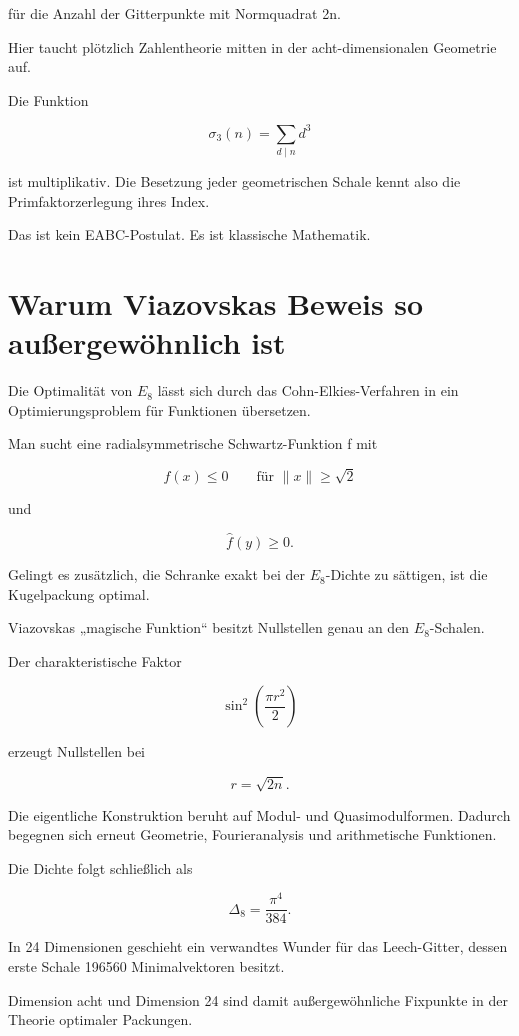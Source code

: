 \documentclass[11pt,a4paper]{article}
\begin{document}
für die Anzahl der Gitterpunkte mit Normquadrat 2n.


Hier taucht plötzlich Zahlentheorie mitten in der acht-dimensionalen Geometrie auf.


Die Funktion


\[
\sigma_3(n)=\sum_{d\mid n}d^3
\]


ist multiplikativ. Die Besetzung jeder geometrischen Schale kennt also die Primfaktorzerlegung ihres Index.


Das ist kein EABC-Postulat. Es ist klassische Mathematik.





\section{Warum Viazovskas Beweis so außergewöhnlich ist}


Die Optimalität von \(E_8\) lässt sich durch das Cohn-Elkies-Verfahren in ein Optimierungsproblem für Funktionen übersetzen.


Man sucht eine radialsymmetrische Schwartz-Funktion f mit


\[
f(x)\le0
\qquad
\text{für }\|x\|\ge\sqrt{2}
\]


und


\[
\widehat f(y)\ge0.
\]


Gelingt es zusätzlich, die Schranke exakt bei der \(E_8\)-Dichte zu sättigen, ist die Kugelpackung optimal.


Viazovskas „magische Funktion“ besitzt Nullstellen genau an den \(E_8\)-Schalen.


Der charakteristische Faktor


\[
\sin^2\left(\frac{\pi r^2}{2}\right)
\]


erzeugt Nullstellen bei


\[
r=\sqrt{2n}.
\]


Die eigentliche Konstruktion beruht auf Modul- und Quasimodulformen. Dadurch begegnen sich erneut Geometrie, Fourieranalysis und arithmetische Funktionen.


Die Dichte folgt schließlich als


\[
\Delta_8
=
\frac{\pi^4}{384}.
\]


In 24 Dimensionen geschieht ein verwandtes Wunder für das Leech-Gitter, dessen erste Schale 196560 Minimalvektoren besitzt.


Dimension acht und Dimension 24 sind damit außergewöhnliche Fixpunkte in der Theorie optimaler Packungen.
\end{document}

